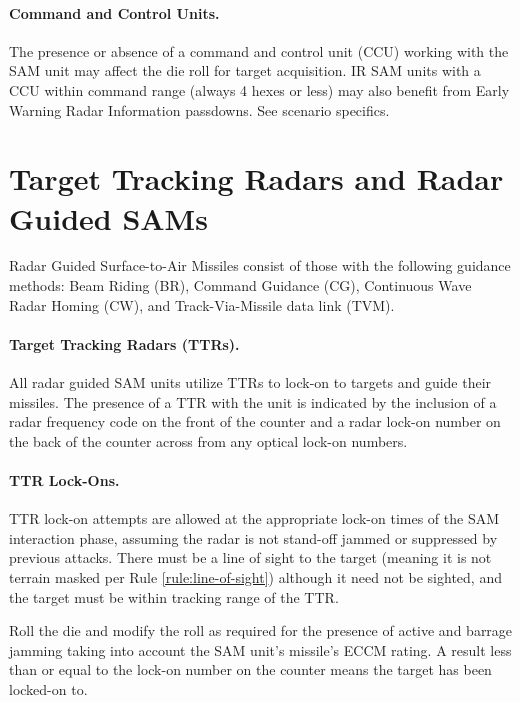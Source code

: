 \paragraph{Command and Control Units.} The presence or absence of a command and control unit (CCU) working with the SAM unit may affect the die roll for target acquisition. IR SAM units with a CCU within command range (always 4 hexes or less) may also benefit from Early Warning Radar Information passdowns. See scenario specifics.

\section{Target Tracking Radars and Radar Guided SAMs}
\label{rule:radar-guided-sams}

Radar Guided Surface-to-Air Missiles consist of those with the following guidance methods: Beam Riding (BR), Command Guidance (CG), Continuous Wave Radar Homing (CW), and Track-Via-Missile data link (TVM).

\paragraph{Target Tracking Radars (TTRs).} All radar guided SAM units utilize TTRs to lock-on to targets and guide their missiles. The presence of a TTR with the unit is indicated by the inclusion of a radar frequency code on the front of the counter and a radar lock-on number on the back of the counter across from any optical lock-on numbers.

\paragraph{TTR Lock-Ons.} 

TTR lock-on attempts are allowed at the appropriate lock-on times of the SAM interaction phase, assuming the radar is not stand-off jammed or suppressed by previous attacks. There must be a line of sight to the target (meaning it is not terrain masked per Rule \ref{rule:line-of-sight}) although it need not be sighted, and the target must be within tracking range of the TTR.

Roll the die and modify the roll as required for the presence of active and barrage jamming taking into account the SAM unit's missile's ECCM rating. A result less than or equal to the lock-on number on the counter means the target has been locked-on to.               

